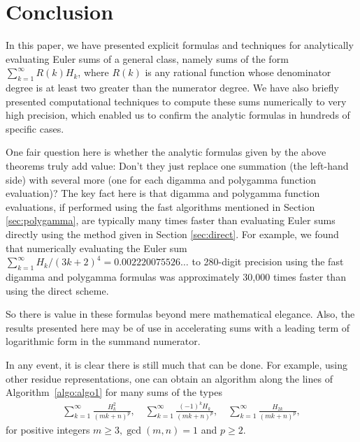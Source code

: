 \documentclass{article}
\theoremstyle{definition}
\begin{document}
\section{Conclusion}

In this paper, we have presented explicit formulas and techniques for analytically evaluating Euler sums of a general class, namely sums of the form $\sum_{k=1}^\infty R(k) H_k$, where $R(k)$ is any rational function whose denominator degree is at least two greater than the numerator degree. We have also briefly presented computational techniques to compute these sums numerically to very high precision, which enabled us to confirm the analytic formulas in hundreds of specific cases.

One fair question here is whether the analytic formulas given by the above theorems truly add value: Don't they just replace one summation (the left-hand side) with several more (one for each digamma and polygamma function evaluation)?  The key fact here is that digamma and polygamma function evaluations, if performed using the fast algorithms mentioned in Section \ref{sec:polygamma}, are typically many times faster than evaluating Euler sums directly using the method given in Section \ref{sec:direct}. For example, we found that numerically evaluating the Euler sum $\sum_{k=1}^\infty H_k/(3k+2)^4 = 0.002220075526\ldots$ to 280-digit precision using the fast digamma and polygamma formulas was approximately 30,000 times faster than using the direct scheme.

So there is value in these formulas beyond mere mathematical elegance. Also, the results presented here may be of use in accelerating sums with a leading term of logarithmic form in the summand numerator.

In any event, it is clear there is still much that can be done. For example, using other residue representations, one can obtain an algorithm along the lines of Algorithm~\ref{algo:algo1} for many sums of the types
\begin{align}
\sum_{k=1}^\infty \frac{H_k^2}{(m k + n)^p}, \quad \sum_{k=1}^\infty \frac{(-1)^k H_k}{(m k + n)^p}, \quad \sum_{k=1}^\infty \frac{H_{2k}}{(m k + n)^p},
\end{align}
for positive integers $m \geq 3, \gcd(m,n) = 1$ and $p \geq 2$. 
\end{document}
